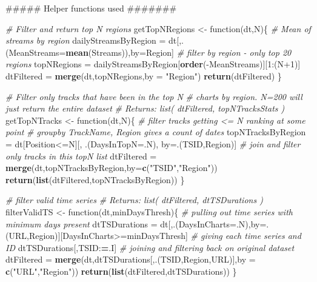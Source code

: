 \documentclass[]{article}
\newenvironment{Shaded}{\begin{snugshade}}{\end{snugshade}}
\newcommand{\KeywordTok}[1]{\textcolor[rgb]{0.13,0.29,0.53}{\textbf{{#1}}}}
\newcommand{\DataTypeTok}[1]{\textcolor[rgb]{0.13,0.29,0.53}{{#1}}}
\newcommand{\DecValTok}[1]{\textcolor[rgb]{0.00,0.00,0.81}{{#1}}}
\newcommand{\StringTok}[1]{\textcolor[rgb]{0.31,0.60,0.02}{{#1}}}
\newcommand{\CommentTok}[1]{\textcolor[rgb]{0.56,0.35,0.01}{\textit{{#1}}}}
\newcommand{\ErrorTok}[1]{\textcolor[rgb]{0.64,0.00,0.00}{\textbf{{#1}}}}
\newcommand{\NormalTok}[1]{{#1}}
\begin{document}
\begin{Shaded}
\begin{Highlighting}[]
\NormalTok{##### Helper functions used #######}

\CommentTok{# Filter and return top N regions }
\NormalTok{getTopNRegions <-}\StringTok{ }\NormalTok{function(dt,N)\{}
  \CommentTok{# Mean of streams by region}
  \NormalTok{dailyStreamsByRegion =}\StringTok{ }\NormalTok{dt[,.(}\DataTypeTok{MeanStreams=}\KeywordTok{mean}\NormalTok{(Streams)),by=Region]}
  \CommentTok{# filter by region - only top 20 regions}
  \NormalTok{topNRegions =}\StringTok{ }\NormalTok{dailyStreamsByRegion[}\KeywordTok{order}\NormalTok{(-MeanStreams)][}\DecValTok{1}\NormalTok{:(N}\DecValTok{+1}\NormalTok{)]}
  \NormalTok{dtFiltered =}\StringTok{ }\KeywordTok{merge}\NormalTok{(dt,topNRegions,}\DataTypeTok{by =} \StringTok{"Region"}\NormalTok{)}
  \KeywordTok{return}\NormalTok{(dtFiltered)}
\NormalTok{\}}

\CommentTok{# Filter only tracks that have been in the top N }
\CommentTok{# charts by region. N=200 will just return the entire dataset}
\CommentTok{# Returns: list( dtFiltered, topNTracksStats )}
\NormalTok{getTopNTracks <-}\StringTok{ }\NormalTok{function(dt,N)\{}
  \CommentTok{# filter tracks getting <= N ranking at some point}
  \CommentTok{# groupby TrackName, Region gives a count of dates }
  \NormalTok{topNTracksByRegion =}\StringTok{ }\NormalTok{dt[Position<=N][,}
                               \NormalTok{.(}\DataTypeTok{DaysInTopN=}\NormalTok{.N),}
                               \NormalTok{by=.(TSID,Region)]}
  \CommentTok{# join and filter only tracks in this topN list}
  \NormalTok{dtFiltered =}\StringTok{ }\KeywordTok{merge}\NormalTok{(dt,topNTracksByRegion,}\DataTypeTok{by=}\KeywordTok{c}\NormalTok{(}\StringTok{"TSID"}\NormalTok{,}\StringTok{"Region"}\NormalTok{))}
  \KeywordTok{return}\NormalTok{(}\KeywordTok{list}\NormalTok{(dtFiltered,topNTracksByRegion))}
\NormalTok{\}}

\CommentTok{# filter valid time series }
\CommentTok{# Returns: list( dtFiltered, dtTSDurations )}
\NormalTok{filterValidTS <-}\StringTok{ }\NormalTok{function(dt,minDaysThresh)\{}
  \CommentTok{# pulling out time series with minimum days present }
  \NormalTok{dtTSDurations =}\StringTok{ }\NormalTok{dt[,.(}\DataTypeTok{DaysInCharts=}\NormalTok{.N),by=.(URL,Region)][DaysInCharts>=minDaysThresh]}
  \CommentTok{# giving each time series and ID}
  \NormalTok{dtTSDurations[,TSID:}\ErrorTok{=}\NormalTok{.I]}
  \CommentTok{# joining and filtering back on original dataset}
  \NormalTok{dtFiltered =}\StringTok{ }\KeywordTok{merge}\NormalTok{(dt,dtTSDurations[,.(TSID,Region,URL)],}\DataTypeTok{by =} \KeywordTok{c}\NormalTok{(}\StringTok{"URL"}\NormalTok{,}\StringTok{"Region"}\NormalTok{))}
  \KeywordTok{return}\NormalTok{(}\KeywordTok{list}\NormalTok{(dtFiltered,dtTSDurations))}
\NormalTok{\}}


\end{Highlighting}
\end{Shaded}
\end{document}

